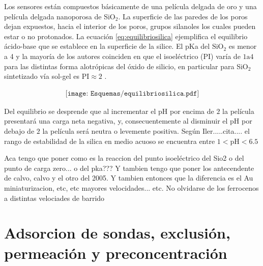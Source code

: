 	Los sensores están compuestos básicamente de una película delgada de oro y una película delgada nanoporosa de SiO$_2$. La superficie de las paredes de los poros dejan expuestos, hacia el interior de los poros, grupos silanoles los cuales pueden estar o no protonados.\cite{Brinker1990,Soler-Illia2011} La ecuación \ref{eq:equilibriosilica} ejemplifica el equilibrio ácido-base que se establece en la superficie de la silice. El pKa del $\text{SiO}_2$ es menor a 4 y la mayoría de los autores coinciden en que el isoeléctrico (PI) varía de $1 \text{a} 4$ para las distintas forma alotrópicas del óxido de silicio, en particular para SiO$_2$ sintetizado vía sol-gel es $\text{PI}\approx 2$ \cite{Kosmulski2002,Kosmulski2014,Schwarz1984}.

				\begin{equation}
				\begin{aligned}
				\texttt{[image: Esquemas/equilibriosilica.pdf]}
				\label{eq:equilibriosilica}
				\end{aligned}
				\end{equation}

	Del equilibrio se desprende que al incrementar el pH por encima de $2$ la película presentará una carga neta negativa, y, consecuentemente al disminuir el pH por debajo de $2$ la película será neutra o levemente positiva. Según Iler.....cita.... el rango de estabilidad de la silica en medio acuoso se encuentra entre $1<\text{pH}<6.5$ 
				
	Aca tengo que poner como es la reaccion del punto isoeléctrico del Sio2 o del punto de carga zero... o del pka??? Y tambien tengo que poner los antecendente de calvo, calvo y el otro del 2005. Y tambien entonces que la diferencia es el Au miniaturizacion, etc, etc mayores velocidades... etc. 
	No olvidarse de los ferrocenos a distintas velociades de barrido
	

\section{Adsorcion de sondas, exclusión, permeación y preconcentración}

